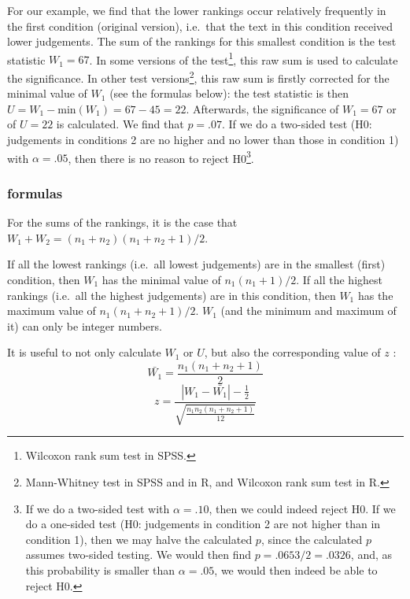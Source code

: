 \documentclass[
]{book}
\begin{document}
For our example, we find that the lower rankings occur relatively frequently
in the first condition (original version), i.e.~that the text in this condition
received lower judgements. The sum of the rankings for this
smallest condition is the test statistic \(W_1=67\). In some versions of the
test\footnote{Wilcoxon rank sum test in SPSS.}, this raw sum is used to calculate the significance.
In other test versions\footnote{Mann-Whitney test in SPSS and in R, and Wilcoxon rank sum test in R.}, this raw sum is firstly corrected for the
minimal value of \(W_1\) (see the formulas below): the test statistic
is then \(U=W_1 - \textrm{min}(W_1) = 67-45=22\). Afterwards, the significance
of \(W_1=67\) or of \(U=22\) is calculated. We find that \(p=.07\). If we do a
two-sided test (H0: judgements in conditions 2 are no higher and no lower
than those in condition 1) with \(\alpha=.05\), then there is no reason to
reject H0\footnote{If we do a two-sided test with \(\alpha=.10\), then we could indeed
  reject H0. If we do a one-sided test (H0: judgements in condition 2 are not higher
  than in condition 1), then we may halve the calculated \(p\), since the calculated
  \(p\) assumes two-sided testing. We would then find \(p=.0653/2=.0326\), and,
  as this probability is smaller than \(\alpha=.05\), we would then indeed
  be able to reject H0.}.

\hypertarget{formulas-8}{%
\subsubsection{formulas}\label{formulas-8}}

For the sums of the rankings, it is the case that
\(W_1 + W_2 = (n_1+n_2) (n_1+n_2+1) / 2\).

If all the lowest rankings (i.e.~all lowest judgements) are in the smallest (first) condition,
then \(W_1\) has the minimal value of
\(n_1 (n_1+1) /2\).
If all the highest rankings (i.e.~all the highest judgements) are in this condition,
then \(W_1\) has the maximum value of
\(n_1 (n_1+n_2+1) / 2\).
\(W_1\) (and the minimum and maximum of it) can only be integer numbers.

It is useful to not only calculate \(W_1\) or \(U\), but also the
corresponding value of \(z\) \citep{Ferg89}:
\begin{equation}
  \label{eq:Wilcoxon-ranksum}
\bar{W_1} = \frac{ n_1 (n_1+n_2+1) }{ 2 }
\end{equation}
\begin{equation}
   \label{eq:Wilcoxon-ranksum-z}
  z = \frac{ |W_1-\bar{W_1}|-\frac{1}{2} }{ \sqrt{ \frac{n_1 n_2 (n_1+n_2+1)}{12} } }
\end{equation}
\end{document}
